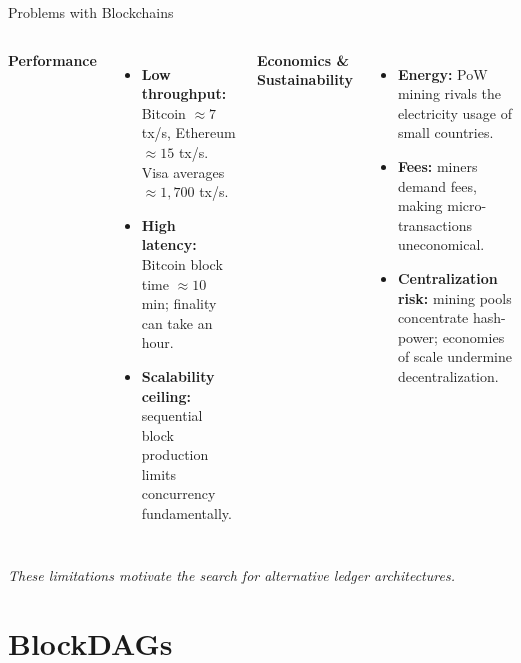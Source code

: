 \documentclass[aspectratio=169]{beamer}
\begin{document}
\begin{frame}{Problems with Blockchains}
  \begin{columns}[T]
    \textbf{Performance}
    \begin{itemize}
      \item \textbf{Low throughput:} Bitcoin $\approx 7$ tx/s, Ethereum $\approx 15$ tx/s.  Visa averages $\approx 1{,}700$ tx/s.
      \item \textbf{High latency:} Bitcoin block time $\approx 10$ min; finality can take an hour.
      \item \textbf{Scalability ceiling:} sequential block production limits concurrency fundamentally.
    \end{itemize}

    \textbf{Economics \& Sustainability}
    \begin{itemize}
      \item \textbf{Energy:} PoW mining rivals the electricity usage of small countries.
      \item \textbf{Fees:} miners demand fees, making micro-transactions uneconomical.
      \item \textbf{Centralization risk:} mining pools concentrate hash-power; economies of scale undermine decentralization.
    \end{itemize}
  \end{columns}

  \bigskip
  \centering
  \textit{These limitations motivate the search for alternative ledger architectures.}
\end{frame}

\section{BlockDAGs}
\end{document}
